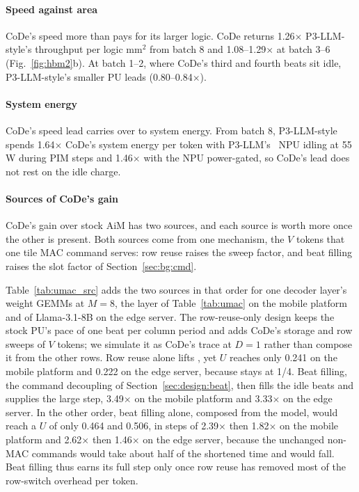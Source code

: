 \paragraph{Speed against area}
CoDe's speed more than pays for its larger logic. CoDe returns 1.26$\times$ P3-LLM-style's throughput per logic
mm$^2$ from batch 8 and 1.08--1.29$\times$ at batch 3--6 (Fig.~\ref{fig:hbm2}b). At batch 1--2, where CoDe's third and
fourth beats sit idle, P3-LLM-style's smaller PU leads (0.80--0.84$\times$).

\paragraph{System energy}
CoDe's speed lead carries over to system energy. From batch 8, P3-LLM-style spends 1.64$\times$ CoDe's system energy per token with P3-LLM's~\cite{p3llm} NPU idling at 55\,W
during PIM steps and 1.46$\times$ with the NPU power-gated, so CoDe's lead does not rest on the idle charge.

\paragraph{Sources of CoDe's gain}
CoDe's gain over stock AiM has two sources, and each source is worth more once the other is present. Both sources
come from one mechanism, the $V$ tokens that one tile MAC command serves: row reuse raises the sweep factor, and
beat filling raises the slot factor of Section~\ref{sec:bg:cmd}.
\begin{table}[t]
  \caption{Useful-MAC utilization from stock AiM to CoDe, one source at a time.}
  \label{tab:umac_src}
  \centering
  \footnotesize
  \setlength{\tabcolsep}{4pt}
  
\end{table}
Table~\ref{tab:umac_src} adds the two sources in that
order for one decoder layer's weight GEMMs at $M = 8$, the layer of Table~\ref{tab:umac} on the mobile platform and
of Llama-3.1-8B on the edge server. The row-reuse-only design keeps the stock PU's pace of one beat per column
period and adds CoDe's storage and row sweeps of $V$ tokens; we simulate it as CoDe's trace at $D = 1$ rather than compose it from the other rows. Row reuse alone lifts
\fMAC, yet $U$ reaches only 0.241 on the mobile platform and 0.222 on the edge server, because \UMAC stays at 1/4.
Beat filling, the command decoupling of Section~\ref{sec:design:beat}, then fills the idle beats and supplies the large step,
3.49$\times$ on the mobile platform and 3.33$\times$ on the edge server. In the other order, beat filling alone,
composed from the model, would reach a $U$ of only 0.464 and 0.506, in steps of 2.39$\times$ then 1.82$\times$ on the mobile
platform and 2.62$\times$ then 1.46$\times$ on the edge server, because the unchanged non-MAC commands would take
about half of the shortened time and \fMAC would fall. Beat filling thus earns its full step only once row reuse has
removed most of the row-switch overhead per token.

